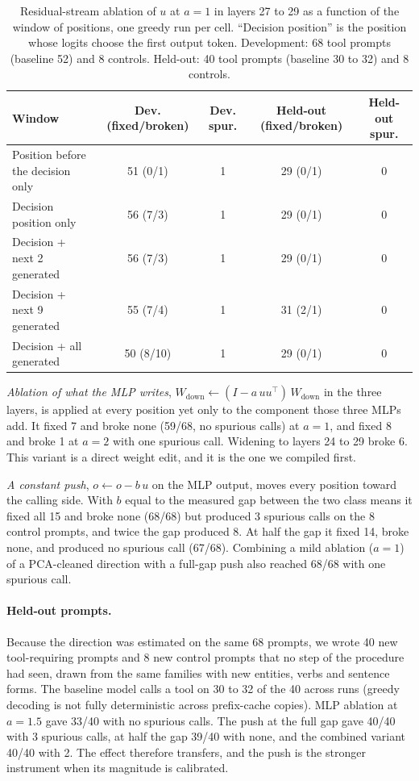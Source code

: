\documentclass[11pt]{article}
\begin{document}
\begin{table}[t]
\centering
\caption{Residual-stream ablation of $u$ at $a=1$ in layers 27 to 29 as a function of the window of positions, one greedy run per cell. ``Decision position'' is the position whose logits choose the first output token. Development: 68 tool prompts (baseline 52) and 8 controls. Held-out: 40 tool prompts (baseline 30 to 32) and 8 controls.}
\label{tab:konum}
\footnotesize
\setlength{\tabcolsep}{4pt}
\begin{tabular}{lcccc}
\toprule
Window & Dev. (fixed/broken) & Dev. spur. & Held-out (fixed/broken) & Held-out spur. \\
\midrule
Position before the decision only & 51 (0/1) & 1 & 29 (0/1) & 0 \\
Decision position only & 56 (7/3) & 1 & 29 (0/1) & 0 \\
Decision + next 2 generated & 56 (7/3) & 1 & 29 (0/1) & 0 \\
Decision + next 9 generated & 55 (7/4) & 1 & 31 (2/1) & 0 \\
Decision + all generated & 50 (8/10) & 1 & 29 (0/1) & 0 \\
\bottomrule
\end{tabular}
\end{table}

\emph{Ablation of what the MLP writes}, $W_{\text{down}} \leftarrow (I - a\,u u^{\top})\,W_{\text{down}}$ in the three layers, is applied at every position yet only to the component those three MLPs add. It fixed 7 and broke none (59/68, no spurious calls) at $a=1$, and fixed 8 and broke 1 at $a=2$ with one spurious call. Widening to layers 24 to 29 broke 6. This variant is a direct weight edit, and it is the one we compiled first.

\emph{A constant push}, $o \leftarrow o - b\,u$ on the MLP output, moves every position toward the calling side. With $b$ equal to the measured gap between the two class means it fixed all 15 and broke none (68/68) but produced 3 spurious calls on the 8 control prompts, and twice the gap produced 8. At half the gap it fixed 14, broke none, and produced no spurious call (67/68). Combining a mild ablation ($a=1$) of a PCA-cleaned direction with a full-gap push also reached 68/68 with one spurious call.

\paragraph{Held-out prompts.} Because the direction was estimated on the same 68 prompts, we wrote 40 new tool-requiring prompts and 8 new control prompts that no step of the procedure had seen, drawn from the same families with new entities, verbs and sentence forms. The baseline model calls a tool on 30 to 32 of the 40 across runs (greedy decoding is not fully deterministic across prefix-cache copies). MLP ablation at $a=1.5$ gave 33/40 with no spurious calls. The push at the full gap gave 40/40 with 3 spurious calls, at half the gap 39/40 with none, and the combined variant 40/40 with 2. The effect therefore transfers, and the push is the stronger instrument when its magnitude is calibrated.
\end{document}
